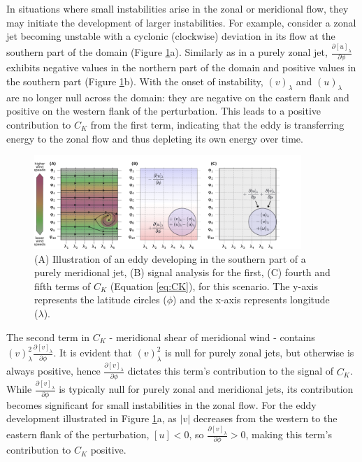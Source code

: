 In situations where small instabilities arise in the zonal or meridional flow, they may initiate the development of larger instabilities. For example, consider a zonal jet becoming unstable with a cyclonic (clockwise) deviation in its flow at the southern part of the domain (Figure \ref{fig:Ck_2}a). Similarly as in a purely zonal jet, \( \frac{\partial [u]_\lambda}{\partial \phi} \) exhibits negative values in the northern part of the domain and positive values in the southern part (Figure \ref{fig:Ck_2}b). With the onset of instability, \( (v)_\lambda \) and \( (u)_\lambda \) are no longer null across the domain: they are negative on the eastern flank and positive on the western flank of the perturbation. This leads to a positive contribution to \( C_K \) from the first term, indicating that the eddy is transferring energy to the zonal flow and thus depleting its own energy over time.

\begin{figure}[h]
\begin{center}
\includegraphics[width=0.9\textwidth]{fig/Ck_2.pdf}
\caption[Meridional Jet With Eddy]{(A) Illustration of an eddy developing in the southern part of a purely meridional jet, (B) signal analysis for the first, (C) fourth and fifth terms of \( C_K \) (Equation \ref{eq:CK}), for this scenario. The y-axis represents the latitude circles (\(\phi\)) and the x-axis represents longitude (\(\lambda\)).}
\label{fig:Ck_2}
\end{center}
\end{figure}

The second term in \( C_K \) - meridional shear of meridional wind - contains \( (v)^{2}_\lambda \frac{\partial [v]_\lambda}{\partial \phi} \). It is evident that \( (v)^{2}_\lambda \) is null for purely zonal jets, but otherwise is always positive, hence \( \frac{\partial [v]_\lambda}{\partial \phi} \) dictates this term's contribution to the signal of \( C_K \). While \( \frac{\partial [v]_\lambda}{\partial \phi} \) is typically null for purely zonal and meridional jets, its contribution becomes significant for small instabilities in the zonal flow. For the eddy development illustrated in Figure \ref{fig:Ck_2}a, as \( |v| \) decreases from the western to the eastern flank of the perturbation, \( [u] < 0 \), so \( \frac{\partial [v]_\lambda}{\partial \phi} > 0 \), making this term's contribution to \( C_K \) positive.

